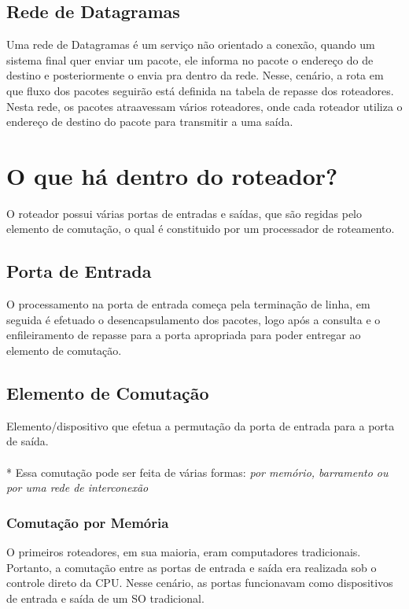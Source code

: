 \documentclass[a4paper, 12pt]{article}
\begin{document}
\subsection{Rede de Datagramas}
Uma rede de Datagramas é um serviço não orientado a conexão, quando um sistema final quer enviar um pacote, ele informa no pacote
o endereço do de destino e posteriormente o envia pra dentro da rede. Nesse, cenário, a rota em que fluxo dos pacotes seguirão está definida
na tabela de repasse dos roteadores. Nesta rede, os pacotes atraavessam vários roteadores, onde cada roteador utiliza o endereço de destino do 
pacote para transmitir a uma saída.

\newpage
\section{O que há dentro do roteador?}
O roteador possui várias portas de entradas e saídas, que são regidas pelo elemento de comutação, o qual é constituido por um processador de
roteamento.

    \subsection{Porta de Entrada}
    O processamento na porta de entrada começa pela terminação de linha, em seguida é efetuado o desencapsulamento dos pacotes, logo após a consulta e o
    enfileiramento de repasse para a porta apropriada para poder entregar ao elemento de comutação.

        \subsection{Elemento de Comutação}
        Elemento/dispositivo que efetua a permutação da porta de entrada para a porta de saída.
        \\\\*
        Essa comutação pode ser feita de várias formas: \textit{por memório, barramento ou por uma rede de interconexão}

        \subsubsection{Comutação por Memória}
        O primeiros roteadores, em sua maioria, eram computadores tradicionais. Portanto, a comutação entre as portas de entrada e saída era realizada 
        sob o controle direto da CPU. Nesse cenário, as portas funcionavam como dispositivos de entrada e saída de um SO tradicional.
\end{document}
